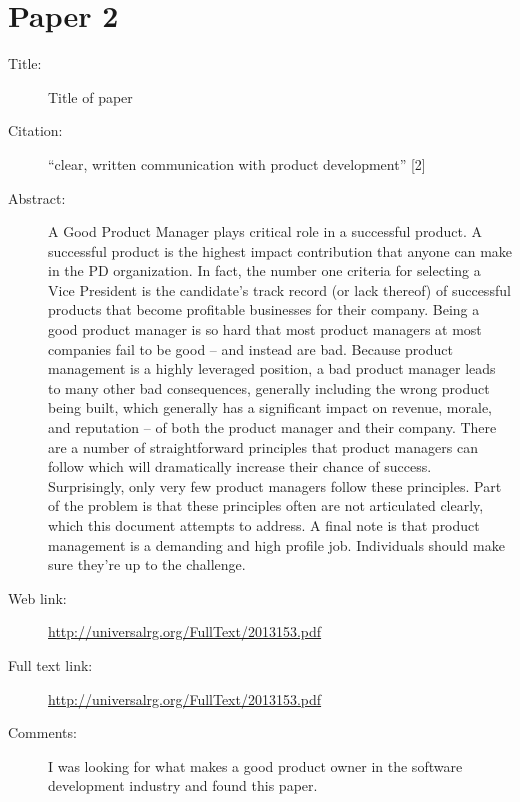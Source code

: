 \documentclass{scrartcl}
\begin{document}
\section*{Paper 2}
\begin{description}
\item[Title:] Title of paper
\item[Citation:] “clear, written communication with product development” [2]
\item[Abstract:] A Good Product Manager plays critical role in a successful product.
A successful product is 
the highest impact contribution that anyone can
make in the PD organization.
In fact, the 
number one criteria for selecting a Vice President is the candidate's track record (or lack 
thereof) of successful products that become profitable businesses for their company. 
Being a good product manager is so
hard that most product managers at most companies fail to 
be good 
--
and instead are bad.
Because product management is a highly leveraged position, a 
bad product manager leads to many other bad consequences, generally including the wrong 
product being built, which generally has a significant impact on revenue, morale, and 
reputation 
--
of both the product manager and their company. 
There are a number of straightforward principles that product managers can follow which will 
dramatically increase their chance of success.
Surprisingly, only very few product managers 
follow these principles.
Part of the problem is that these principles often are not articulated 
clearly, which this document attempts to address. 
A final note is that product management is a 
demanding and high profile job.
Individuals 
should make sure they're up to the challenge. 
\item[Web link:] \url{http://universalrg.org/FullText/2013153.pdf}
\item[Full text link:] \url{http://universalrg.org/FullText/2013153.pdf}
\item[Comments:] I was looking for what makes a good product owner in the software development industry and found this paper.
\end{description}
\end{document}
